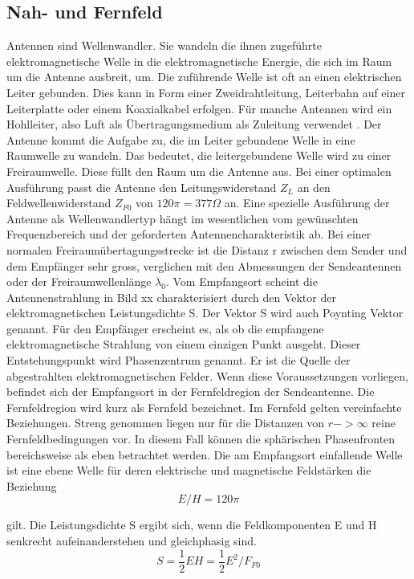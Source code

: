 \subsection{Nah- und Fernfeld}
Antennen sind Wellenwandler. Sie wandeln die ihnen zugeführte elektromagnetische Welle in die elektromagnetische Energie, die sich im Raum um die Antenne ausbreit, um. Die zuführende Welle ist oft an einen elektrischen Leiter gebunden. Dies kann in Form einer Zweidrahtleitung, Leiterbahn auf einer Leiterplatte oder einem Koaxialkabel erfolgen.  Für manche Antennen wird ein Hohlleiter, also Luft als Übertragungsmedium als Zuleitung verwendet . 
Der Antenne kommt die Aufgabe zu, die im Leiter gebundene Welle in eine Raumwelle zu wandeln. Das bedeutet, die leitergebundene Welle wird zu einer Freiraumwelle. Diese füllt den Raum um die Antenne aus. 
Bei einer optimalen Ausführung passt die Antenne den Leitungswiderstand $Z_{L}$ an den Feldwellenwiderstand $Z_{F0}$ von $120\pi = 377 \Omega$ an.
Eine spezielle Ausführung der Antenne als Wellenwandlertyp hängt im wesentlichen vom gewünschten Frequenzbereich und der geforderten Antennencharakteristik ab. Bei einer normalen Freiraumübertagungsstrecke ist die Distanz r zwischen dem Sender und dem Empfänger sehr gross, verglichen mit den Abmessungen der Sendeantennen oder der Freiraumwellenlänge $\lambda_{0}$. Vom Empfangsort scheint die Antennenstrahlung in Bild xx charakterisiert durch den Vektor der elektromagnetischen Leistungsdichte S. 
Der Vektor S wird auch Poynting Vektor genannt. Für den Empfänger erscheint es, als ob die empfangene elektromagnetische Strahlung von einem einzigen Punkt ausgeht. Dieser Entstehungspunkt wird Phasenzentrum genannt. Er ist die Quelle der abgestrahlten elektromagnetischen Felder. Wenn diese Voraussetzungen vorliegen, befindet sich der Empfangsort in der Fernfeldregion der Sendeantenne. Die Fernfeldregion wird kurz als Fernfeld bezeichnet. 
Im Fernfeld gelten vereinfachte Beziehungen. Streng genommen liegen nur für die Distanzen von $r->\infty$ reine Fernfeldbedingungen vor. In diesem Fall können die sphärischen Phasenfronten  bereichsweise als eben betrachtet werden. Die am Empfangsort einfallende Welle ist eine ebene Welle für deren elektrische und magnetische Feldstärken die Beziehung \cite{meinke1992taschenbuch}
\begin{equation}
E/H=120\pi\label{eq:WellenimpedanuE/H}
\end{equation}

gilt. Die Leistungsdichte S ergibt sich, wenn die Feldkomponenten E  und H senkrecht aufeinanderstehen und gleichphasig sind.
\begin{equation}
S=\dfrac{1}{2}EH=\dfrac{1}{2} E^{2}/F_{F0}\label{eq:LeistungsdichteS}
\end{equation}


